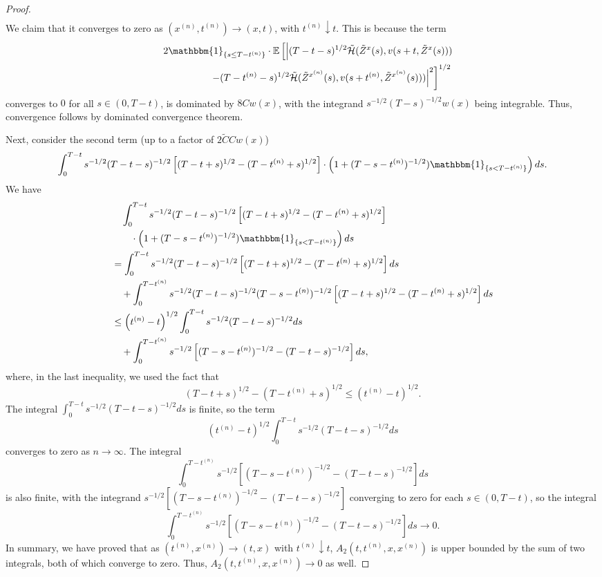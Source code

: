 \documentclass[11pt]{article}
\theoremstyle{definition}
\theoremstyle{plain}
\newcommand{\cH}{{\cal H}}
\newcommand{\mbOne}{\mathbbm{1}}
\begin{document}
\begin{appendices}
\begin{proof}
\begin{align*}
\end{align*}
We claim that it converges to zero as \( (x^{(n)}, t^{(n)}) \to (x, t) \),  with \( t^{(n)} \downarrow t \).
This is because the term
\begin{align*}
&\quad \ 2 \mbOne_{\{s \leq T - t^{(n)}\}} \cdot \mathbb{E} \left[ \left| (T - t - s)^{1/2} 
\tilde \cH(\tilde{Z}^x(s), v(s + t, \tilde{Z}^x(s))) \right. \right. \\
&\left. \left. \qquad \qquad \qquad - (T - t^{(n)} - s)^{1/2} \tilde \cH(\tilde{Z}^{x^{(n)}}(s), v(s + t^{(n)}, \tilde{Z}^{x^{(n)}}(s))) \right|^2 \right]^{1/2}
\end{align*}
converges to $0$ for all \( s \in (0, T - t) \), 
is dominated by $8Cw(x)$, with the integrand $s^{-1/2} (T - s)^{-1/2} w(x)$ being integrable. 
Thus, convergence follows by dominated convergence theorem. 

Next, consider the second term (up to a factor of $2\tilde C C w(x)$)
\begin{align*}
\int_0^{T - t} s^{-1/2} (T - t - s)^{-1/2} 
\left[ (T - t + s)^{1/2} - (T - t^{(n)} + s)^{1/2} \right] \cdot \left(1 + (T - s - t^{(n)})^{-1/2}) \mbOne_{\{s < T - t^{(n)}\}}\right) ds.
\end{align*}
We have 
\begin{align*}
& \quad \int_0^{T - t} s^{-1/2} (T - t - s)^{-1/2} 
\left[ (T - t + s)^{1/2} - (T - t^{(n)} + s)^{1/2} \right] \\
& \qquad \cdot \left(1 + (T - s - t^{(n)})^{-1/2}) \mbOne_{\{s < T - t^{(n)}\}}\right) ds \\
& =   \int_0^{T - t} s^{-1/2} (T - t - s)^{-1/2} \left[ (T - t + s)^{1/2} - (T - t^{(n)} + s)^{1/2} \right] ds \\
& \quad + \int_0^{T - t^{(n)}} s^{-1/2} (T - t - s)^{-1/2} (T - s - t^{(n)})^{-1/2}\left[ (T - t + s)^{1/2} - (T - t^{(n)} + s)^{1/2} \right] ds \\
& \le \left(t^{(n)} - t\right)^{1/2} \int_0^{T - t} s^{-1/2} (T - t - s)^{-1/2}ds \\
& \quad + \int_0^{T - t^{(n)}} s^{-1/2} \left[(T - s - t^{(n)})^{-1/2} - (T - t - s)^{-1/2}\right] ds, 
\end{align*} 
where, in the last inequality, we used the fact that 
\[
(T - t + s)^{1/2} - (T - t^{(n)} + s)^{1/2} \leq \left(t^{(n)} - t\right)^{1/2}. 
\]
The integral $\int_0^{T - t} s^{-1/2} (T - t - s)^{-1/2}ds$ is finite, so the term 
\[
\left(t^{(n)} - t\right)^{1/2} \int_0^{T - t} s^{-1/2} (T - t - s)^{-1/2}ds
\]
converges to zero as $n \to \infty$. The integral 
\[
\int_0^{T - t^{(n)}} s^{-1/2} \left[(T - s - t^{(n)})^{-1/2} - (T - t - s)^{-1/2}\right] ds
\]
is also finite, with the integrand $s^{-1/2} \left[(T - s - t^{(n)})^{-1/2} - (T - t - s)^{-1/2}\right]$ converging to zero for each $s \in (0, T-t)$, 
so the integral 
\[
\int_0^{T - t^{(n)}} s^{-1/2} \left[(T - s - t^{(n)})^{-1/2} - (T - t - s)^{-1/2}\right] ds \to 0.
\]
{In summary}, we have proved that as $(t^{(n)}, x^{(n)}) \to (t,x)$ with $t^{(n)} \downarrow t$, 
$A_2(t, t^{(n)}, x, x^{(n)})$ is upper bounded by the sum of two integrals, both of which converge to zero.  
Thus, $A_2(t, t^{(n)}, x, x^{(n)}) \to 0$ as well.


\end{proof}
\end{appendices}
\end{document}
